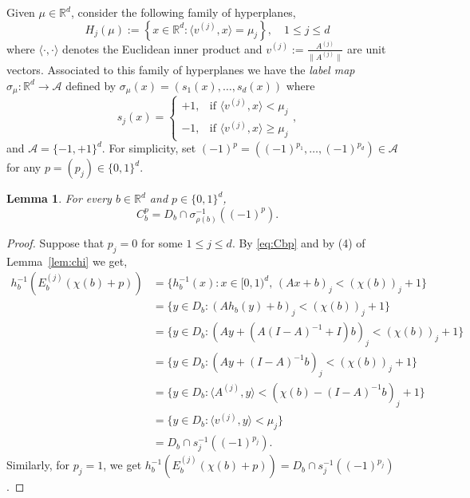 \documentclass[12pt,reqno,a4paper]{amsart}%
\newtheorem{lemma}{Lemma}
\theoremstyle{definition}
\theoremstyle{remark}
\newcommand{\Rr}{\mathbb{R}}
\begin{document}
{{Given $\mu\in\Rr^d$, consider the following family of hyperplanes,
\begin{equation}\label{H} 
H_{{j}}(\mu) := \left\{ x\in\mathbb{R}^d: \langle v^{({j})}, x\rangle = \mu_{{j}}\right\},\quad 1\leq {j} \leq d
\end{equation}
where $\langle\cdot,\cdot\rangle$ denotes the Euclidean inner product and $v^{{(j)}} := \frac{A^{{(j)}}}{\|A^{{(j)}}\|}$ are unit vectors. Associated to this family of hyperplanes we have 
the \textit{label map} $\sigma_\mu\colon \Rr^d\to\mathcal{A}$ defined by $\sigma_\mu(x)=(s_1(x),\ldots,s_d(x))$ where
$$
s_{{j}}(x)=\begin{cases}+1,& \text{if } \langle v^{{(j)}},x\rangle < \mu_{{j}}\\
-1,& \text{if } \langle v^{{(j)}},x\rangle \geq \mu_{{j}}
\end{cases},
$$
and $\mathcal{A}=\{-1,+1\}^d$.
For simplicity, set $(-1)^p = ((-1)^{p_1},\ldots,(-1)^{p_d})\in\mathcal{A}$ for any $p={(p_j)}\in\{0,1\}^d$.
\begin{lemma}\label{lem:Cbp}For every $b\in\Rr^d$ and $p\in\{0,1\}^d$,
$$C_b^p = D_b\cap \sigma^{-1}_{\rho(b)}((-1)^p).$$
\end{lemma}
\begin{proof}
Suppose that ${p_j}=0$ for some ${1\le j\le d}$. By \eqref{eq:Cbp} and by (4) of Lemma~\ref{lem:chi} we get,
\begin{align*}
h_b^{-1}(E_b^{{(j)}}(\chi(b)+p))&=\{h_b^{-1}(x)\colon x\in[0,1)^d,\, (Ax+b)_{{j}}<(\chi(b))_{{j}}+1\}\\
&= \{y\in D_b\colon (Ah_b(y)+b)_{{j}}<(\chi(b))_{{j}}+1\}\\
&= \{y\in D_b\colon (Ay+(A(I-A)^{-1}+I)b)_{{j}}<(\chi(b))_{{j}}+1\}\\
&= \{y\in D_b\colon (Ay+(I-A)^{-1}b)_{{j}}<(\chi(b))_{{j}}+1\}\\
&= \{y\in D_b\colon \langle A^{{(j)}},y\rangle <(\chi(b)-(I-A)^{-1}b)_{{j}}+1\}\\
&= \{y\in D_b\colon \langle v^{{(j)}},y\rangle <\mu_{{j}}\}\\
&= D_b\cap s_{{j}}^{-1}((-1)^{p_{{j}}}).
\end{align*}
Similarly, for $p_{{j}}=1$, we get $h_b^{-1}(E_b^{{(j)}}(\chi(b)+p)) = D_b\cap s_{{j}}^{-1}((-1)^{p_{{j}}})$.


\end{proof}}}
\end{document}
